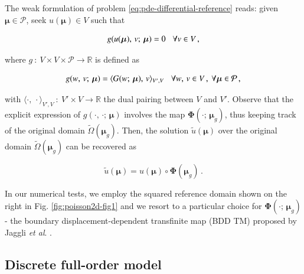 \documentclass[longtitle]{elsarticle}
\numberwithin{equation}{section}
\theoremstyle{theorem}
\theoremstyle{definition}
\theoremstyle{remark}
\theoremstyle{proposition}
\numberwithin{figure}{section}
\newcommand{\wt}[1]{\widetilde{#1}}
\newcommand{\bg}[1]{\boldsymbol{#1}}
\begin{document}
		The weak formulation of problem \eqref{eq:pde-differential-reference} reads: given $\bg{\mu} \in \mathcal{P}$, seek $u(\bg{\mu}) \in V$ such that
		\begin{linenomath}\begin{linenomath}\begin{equation}
			\label{eq:pde-weak-reference}
			g(u(\bg{\mu}), \, v; \, \bg{\mu}) = 0 \hspace*{0.3cm} \forall v \in V \, ,
		\end{equation}\end{linenomath}\end{linenomath}
		where $g ~ : ~ V \times V \times \mathcal{P} \rightarrow \mathbb{R}$ is defined as
		\begin{linenomath}\begin{linenomath}\begin{equation*}
			g(w, \, v; \, \bg{\mu}) = \langle G(w; \, \bg{\mu}), \, v \rangle_{V',V} \hspace*{0.3cm} \forall w, \, v \in V \, , ~ \forall \bg{\mu} \in \mathcal{P} \, ,
		\end{equation*}\end{linenomath}\end{linenomath}
		with $\langle \cdot, \, \cdot \rangle_{V',V} ~ : ~ V' \times V \rightarrow \mathbb{R}$ the dual pairing between $V$ and $V'$. Observe that the explicit expression of $g(\cdot, \, \cdot; \, \bg{\mu})$ involves the map $\bg{\Phi}(\cdot; \, \bg{\mu}_g)$, thus keeping track of the original domain $\wt{\Omega}(\bg{\mu}_g)$. Then, the solution $\wt{u}(\bg{\mu})$ over the original domain $\wt{\Omega}(\bg{\mu}_g)$ can be recovered as
		\begin{linenomath}\begin{linenomath}\begin{equation*}
			\wt{u}(\bg{\mu}) = u(\bg{\mu}) \circ \bg{\Phi}(\bg{\mu}_g) \, .
		\end{equation*}\end{linenomath}\end{linenomath}
		In our numerical tests, we employ the squared reference domain shown on the right in Fig. \ref{fig:poisson2d-fig1} and we resort to a particular choice for $\bg{\Phi}(\cdot; \, \bg{\mu}_g)$ - the boundary displacement-dependent transfinite map (BDD TM) proposed by Jaggli \emph{et al}. \cite{JIR14}.
				
	
	\subsection{Discrete full-order model}
	\label{section:Discrete full-order model}
	
\end{document}
